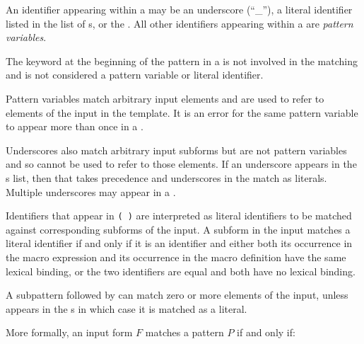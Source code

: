 \begin{entry}
An identifier appearing within a  may be an underscore
(``{\cf \_}''), a literal identifier listed in the list of s,
or the .
All other identifiers appearing within a  are
{\em pattern variables}.

The keyword at the beginning of the pattern in a
 is not involved in the matching and
is not considered a pattern variable or literal identifier.


Pattern variables match arbitrary input elements and
are used to refer to elements of the input in the template.  
It is an error for the same pattern variable to appear more than once in a
.

Underscores also match arbitrary input subforms but are not pattern variables
and so cannot be used to refer to those elements.  If an underscore appears
in the s list, then that takes precedence and
underscores in the  match as literals.
Multiple underscores may appear in a .

Identifiers that appear in \texttt{( \dotsfoo)} are
interpreted as literal
identifiers to be matched against corresponding subforms of the input.
A subform in the input matches a literal identifier if and only if it is an
identifier and either both its occurrence in the macro expression and its
occurrence in the macro definition have the same lexical binding, or
the two identifiers are equal and both have no lexical binding.


A subpattern followed by  can match zero or more elements of
the input, unless  appears in the s in which
case it is matched as a literal.

More formally, an input form $F$ matches a pattern $P$ if and only if:


\end{entry}
